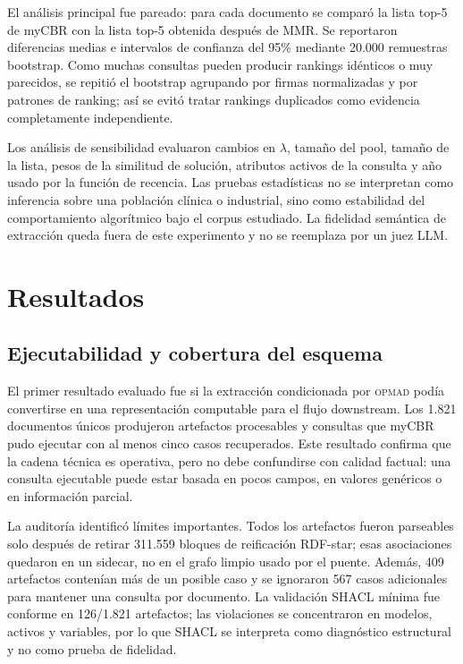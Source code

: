 \documentclass[11pt,a4paper]{article}
\newcommand{\OPMAD}{\textsc{opmad}}
\newcommand{\myCBR}{myCBR}
\begin{document}
El análisis principal fue pareado: para cada documento se comparó la lista top-5 de \myCBR{} con la lista top-5 obtenida después de MMR. Se reportaron diferencias medias e intervalos de confianza del 95\% mediante 20.000 remuestras bootstrap. Como muchas consultas pueden producir rankings idénticos o muy parecidos, se repitió el bootstrap agrupando por firmas normalizadas y por patrones de ranking; así se evitó tratar rankings duplicados como evidencia completamente independiente.

Los análisis de sensibilidad evaluaron cambios en $\lambda$, tamaño del pool, tamaño de la lista, pesos de la similitud de solución, atributos activos de la consulta y año usado por la función de recencia. Las pruebas estadísticas no se interpretan como inferencia sobre una población clínica o industrial, sino como estabilidad del comportamiento algorítmico bajo el corpus estudiado. La fidelidad semántica de extracción queda fuera de este experimento y no se reemplaza por un juez LLM.

\section{Resultados}
\label{sec:results}

\subsection{Ejecutabilidad y cobertura del esquema}

El primer resultado evaluado fue si la extracción condicionada por \OPMAD{} podía convertirse en una representación computable para el flujo downstream. Los 1.821 documentos únicos produjeron artefactos procesables y consultas que \myCBR{} pudo ejecutar con al menos cinco casos recuperados. Este resultado confirma que la cadena técnica es operativa, pero no debe confundirse con calidad factual: una consulta ejecutable puede estar basada en pocos campos, en valores genéricos o en información parcial.

La auditoría identificó límites importantes. Todos los artefactos fueron parseables solo después de retirar 311.559 bloques de reificación RDF-star; esas asociaciones quedaron en un sidecar, no en el grafo limpio usado por el puente. Además, 409 artefactos contenían más de un posible caso y se ignoraron 567 casos adicionales para mantener una consulta por documento. La validación SHACL mínima fue conforme en 126/1.821 artefactos; las violaciones se concentraron en modelos, activos y variables, por lo que SHACL se interpreta como diagnóstico estructural y no como prueba de fidelidad.
\end{document}
